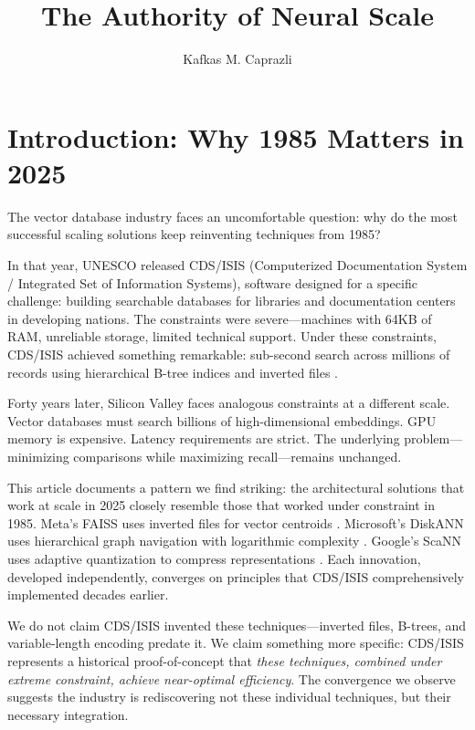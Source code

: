 \documentclass[manuscript,screen,nonacm]{acmart}
\title{The Authority of Neural Scale}
\author{Kafkas M. Caprazli}
\affiliation{%
  \institution{Independent Researcher}
  \city{Wolfsburg}
  \country{Germany}
}
\begin{document}
\maketitle

\section{Introduction: Why 1985 Matters in 2025}

The vector database industry faces an uncomfortable question: why do the most successful scaling solutions keep reinventing techniques from 1985?

In that year, UNESCO released CDS/ISIS (Computerized Documentation System / Integrated Set of Information Systems), software designed for a specific challenge: building searchable databases for libraries and documentation centers in developing nations. The constraints were severe---machines with 64KB of RAM, unreliable storage, limited technical support. Under these constraints, CDS/ISIS achieved something remarkable: sub-second search across millions of records using hierarchical B-tree indices and inverted files \cite{delbigio1995, unesco1989}.

Forty years later, Silicon Valley faces analogous constraints at a different scale. Vector databases must search billions of high-dimensional embeddings. GPU memory is expensive. Latency requirements are strict. The underlying problem---minimizing comparisons while maximizing recall---remains unchanged.

This article documents a pattern we find striking: the architectural solutions that work at scale in 2025 closely resemble those that worked under constraint in 1985. Meta's FAISS uses inverted files for vector centroids \cite{johnson2017}. Microsoft's DiskANN uses hierarchical graph navigation with logarithmic complexity \cite{subramanya2019}. Google's ScaNN uses adaptive quantization to compress representations \cite{guo2020}. Each innovation, developed independently, converges on principles that CDS/ISIS comprehensively implemented decades earlier.

We do not claim CDS/ISIS invented these techniques---inverted files, B-trees, and variable-length encoding predate it. We claim something more specific: CDS/ISIS represents a historical proof-of-concept that \emph{these techniques, combined under extreme constraint, achieve near-optimal efficiency}. The convergence we observe suggests the industry is rediscovering not these individual techniques, but their necessary integration.
\end{document}
